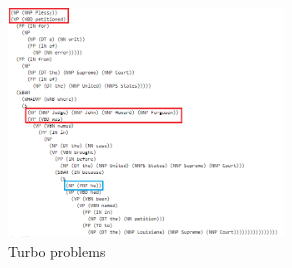 \documentclass{article}
\begin{document}
\begin{figure}[h!]
    \centering
\includegraphics[width=0.65\textwidth]{Example5.png}
    \caption{Turbo problems}
\end{figure}
\end{document}
